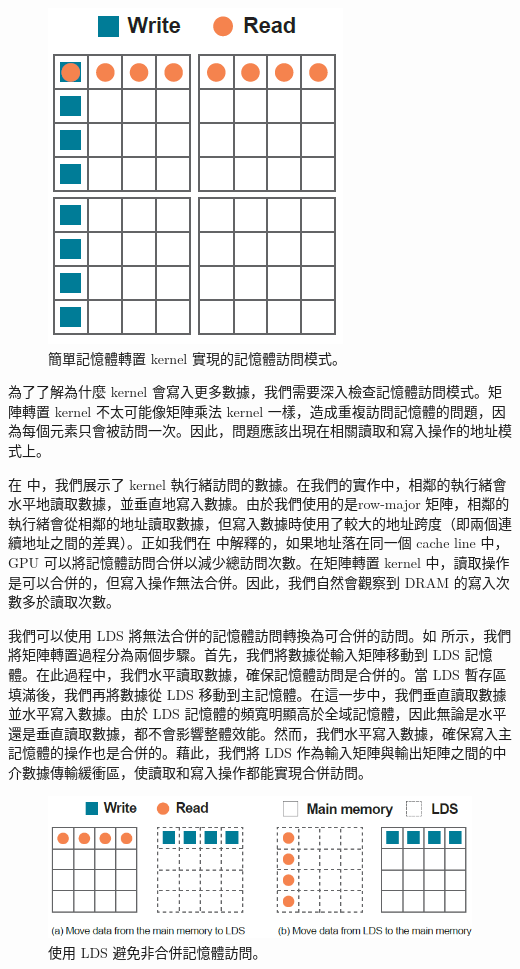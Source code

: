 \begin{figure}[h]
    \centering
    \includegraphics[width=0.4\linewidth]{FileAusiliari/Screenshots/Figure8-9.png}
    \caption{簡單記憶體轉置 kernel 實現的記憶體訪問模式。}
    \label{fig:transpose}
\end{figure}

為了了解為什麼 kernel 會寫入更多數據，我們需要深入檢查記憶體訪問模式。矩陣轉置 kernel 不太可能像矩陣乘法 kernel 一樣，造成重複訪問記憶體的問題，因為每個元素只會被訪問一次。因此，問題應該出現在相關讀取和寫入操作的地址模式上。

在  中，我們展示了 kernel 執行緒訪問的數據。在我們的實作中，相鄰的執行緒會水平地讀取數據，並垂直地寫入數據。由於我們使用的是row-major 矩陣，相鄰的執行緒會從相鄰的地址讀取數據，但寫入數據時使用了較大的地址跨度（即兩個連續地址之間的差異）。正如我們在   中解釋的，如果地址落在同一個 cache line 中，GPU 可以將記憶體訪問合併以減少總訪問次數。在矩陣轉置 kernel 中，讀取操作是可以合併的，但寫入操作無法合併。因此，我們自然會觀察到 DRAM 的寫入次數多於讀取次數。

我們可以使用 LDS 將無法合併的記憶體訪問轉換為可合併的訪問。如  所示，我們將矩陣轉置過程分為兩個步驟。首先，我們將數據從輸入矩陣移動到 LDS 記憶體。在此過程中，我們水平讀取數據，確保記憶體訪問是合併的。當 LDS 暫存區填滿後，我們再將數據從 LDS 移動到主記憶體。在這一步中，我們垂直讀取數據並水平寫入數據。由於 LDS 記憶體的頻寬明顯高於全域記憶體，因此無論是水平還是垂直讀取數據，都不會影響整體效能。然而，我們水平寫入數據，確保寫入主記憶體的操作也是合併的。藉此，我們將 LDS 作為輸入矩陣與輸出矩陣之間的中介數據傳輸緩衝區，使讀取和寫入操作都能實現合併訪問。

\begin{figure}[h]
    \centering
    \includegraphics[width=0.8\linewidth]{FileAusiliari/Screenshots/Figure8-10.png}
    \caption{使用 LDS 避免非合併記憶體訪問。}
    \label{fig:lds}
\end{figure}

